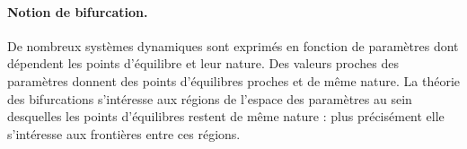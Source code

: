 \paragraph*{Notion de bifurcation.}
De nombreux systèmes dynamiques sont exprimés en fonction de paramètres dont dépendent les points d'équilibre et leur nature. Des valeurs proches des paramètres donnent des points d'équilibres proches et de même nature. La théorie des bifurcations s'intéresse aux régions de l'espace des paramètres au sein desquelles les points d'équilibres restent de même nature : plus précisément elle s'intéresse aux frontières entre ces régions.



